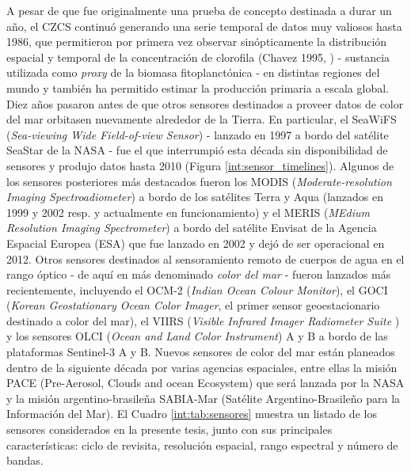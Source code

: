     A pesar de que fue originalmente una prueba de concepto destinada a durar un año, el CZCS continuó generando una serie temporal de datos muy valiosos hasta 1986, que permitieron por primera vez observar sinópticamente la distribución espacial y temporal de la concentración de clorofila (Chavez 1995, \cite{chavez1995}) - sustancia utilizada como \textit{proxy} de la biomasa fitoplanctónica - en distintas regiones del mundo y también ha permitido estimar la producción primaria a escala global. Diez años pasaron antes de que otros sensores destinados a proveer datos de color del mar orbitasen nuevamente alrededor de la Tierra. En particular, el SeaWiFS (\textit{Sea-viewing Wide Field-of-view Sensor}) - lanzado en 1997 a bordo del satélite SeaStar de la NASA - fue el que interrumpió esta década sin disponibilidad de sensores y produjo datos hasta 2010 (Figura \ref{int:sensor_timelines}). Algunos de los sensores posteriores más destacados fueron los MODIS (\textit{Moderate-resolution Imaging Spectroadiometer}) a bordo de los satélites Terra y Aqua (lanzados en 1999 y 2002 resp. y actualmente en funcionamiento) y el MERIS (\textit{MEdium Resolution Imaging Spectrometer}) a bordo del satélite Envisat de la Agencia Espacial Europea (ESA) que fue lanzado en 2002 y dejó de ser operacional en 2012. Otros sensores destinados al sensoramiento remoto de cuerpos de agua en el rango óptico - de aquí en más denominado \textit{color del mar} - fueron lanzados más recientemente, incluyendo el OCM-2 (\textit{Indian Ocean Colour Monitor}), el GOCI (\textit{Korean Geostationary Ocean Color Imager}, el primer sensor geoestacionario destinado a color del mar), el VIIRS (\textit{Visible Infrared Imager Radiometer Suite }) y los sensores OLCI (\textit{Ocean and Land Color Instrument}) A y B a bordo de las plataformas Sentinel-3 A y B. Nuevos sensores de color del mar están planeados dentro de la siguiente década por varias agencias espaciales, entre ellas la misión PACE (Pre-Aerosol, Clouds and ocean Ecosystem) que será lanzada por la NASA y la misión argentino-brasileña SABIA-Mar (Satélite Argentino-Brasileño para la Información del Mar). El Cuadro \ref{int:tab:sensores} muestra un listado de los sensores considerados en la presente tesis, junto con sus principales características: ciclo de revisita, resolución espacial, rango espectral y número de bandas.

